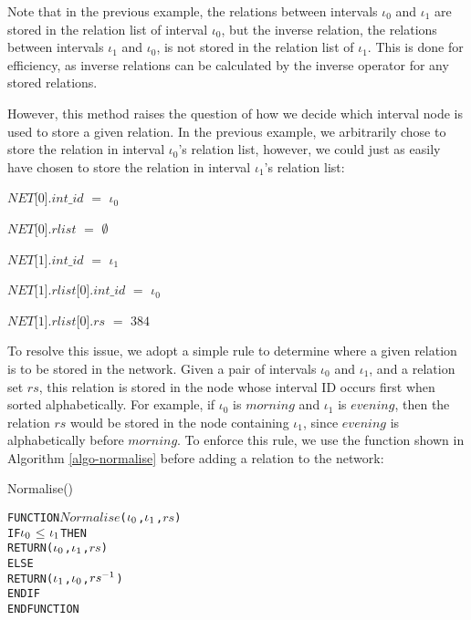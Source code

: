 \documentclass[11pt]{report}
\newenvironment{vverbatim}
{
  \begin{alltt}
}
{
    \vspace{-\baselineskip}
  \end{alltt}
}
\newlength{\valgorithmboxwidth}
\newenvironment{valgorithm}[3][tbhp]
{
  \setlength{\valgorithmboxwidth}{\linewidth-2em}

  \begin{valgorithmfloat}[#1]
    \caption{#2}
    \label{#3}
    \hspace{1em}
    \begin{lrbox}{\valgorithmbox}
      \begin{minipage}[l]{\valgorithmboxwidth}
        \small
        \begin{vverbatim}
}
{
        \end{vverbatim}
      \end{minipage}
    \end{lrbox}
    \framebox[\valgorithmboxwidth][l]{\usebox{\valgorithmbox}}
  \end{valgorithmfloat}
}
\newenvironment{vquote}
{
  \begin{list}{}{\leftmargin 1em}\item[]
}
{
  \end{list}
}
\begin{document}
          Note that in the previous example, the relations between intervals
          $\iota_0$ and $\iota_1$ are stored in the relation list of interval
          $\iota_0$, but the inverse relation, the relations between intervals
          $\iota_1$ and $\iota_0$, is not stored in the relation list of
          $\iota_1$. This is done for efficiency, as inverse relations can be
          calculated by the inverse operator for any stored relations.

          However, this method raises the question of how we decide which
          interval node is used to store a given relation. In the previous
          example, we arbitrarily chose to store the relation in interval
          $\iota_0$'s relation list, however, we could just as easily have
          chosen to store the relation in interval $\iota_1$'s relation list:

          \begin{vquote}
            $NET$[$0$].$int\_id$ $=$ $\iota_0$

            $NET$[$0$].$rlist$ $=$ $\emptyset$

            $NET$[$1$].$int\_id$ $=$ $\iota_1$

            $NET$[$1$].$rlist$[$0$].$int\_id$ $=$ $\iota_0$

            $NET$[$1$].$rlist$[$0$].$rs$ $=$ $384$
          \end{vquote}

          To resolve this issue, we adopt a simple rule to determine where a
          given relation is to be stored in the network. Given a pair of
          intervals $\iota_0$ and $\iota_1$, and a relation set $rs$, this
          relation is stored in the node whose interval ID occurs first when
          sorted alphabetically. For example, if $\iota_0$ is $morning$ and
          $\iota_1$ is $evening$, then the relation $rs$ would be stored
          in the node containing $\iota_1$, since $evening$ is alphabetically
          before $morning$. To enforce this rule, we use the function shown in
          Algorithm \ref{algo-normalise} before adding a relation to the
          network:

          \begin{valgorithm}[tbhp]{Normalise()}{algo-normalise}
FUNCTION \(Normalise\)(\(\iota\sb{0}\), \(\iota\sb{1}\), \(rs\))
  IF \(\iota\sb{0}\) \(\leq\) \(\iota\sb{1}\) THEN
    RETURN (\(\iota\sb{0}\), \(\iota\sb{1}\), \(rs\)) 
  ELSE
    RETURN (\(\iota\sb{1}\), \(\iota\sb{0}\), \(rs\sp{-1}\)) 
  ENDIF
ENDFUNCTION
          \end{valgorithm}
\end{document}
